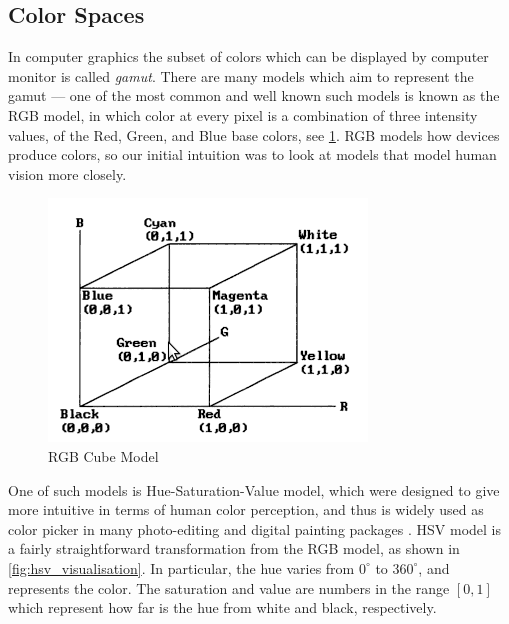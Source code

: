 \documentclass{report}
\begin{document}
\subsection{Color Spaces}
\label{sec:colorSpaces}
In computer graphics the subset of colors which can be displayed by computer monitor is called \emph{gamut}\cite{color_model_ref}. There are many models which aim to represent the gamut --- one of the most common and well known such models is known as the RGB model, in which color at every pixel is a combination of three intensity values, of the Red, Green, and Blue base colors, see \ref{fig:rgb_cube}. RGB models how devices produce colors, so our initial intuition was to look at models that model human vision more closely.  
\begin{figure}[hbtp]
\centering
\includegraphics[scale=0.5]{graphics/rgb_cube.png}
\caption{RGB Cube Model}
\label{fig:rgb_cube}
\end{figure}

One of such models is Hue-Saturation-Value model, which were designed to give more intuitive in terms of human color perception, and thus is widely used as color picker in many photo-editing and digital painting packages \cite{color_model_ref}.
HSV model is a fairly straightforward transformation from the RGB model, as shown in \ref{fig:hsv_visualisation}. In particular, the hue varies from $0^{\circ}$ to $360^{\circ}$, and represents the color. The saturation and value are numbers in the range $[0,1]$ which represent how far is the hue from white and black, respectively.
\end{document}
